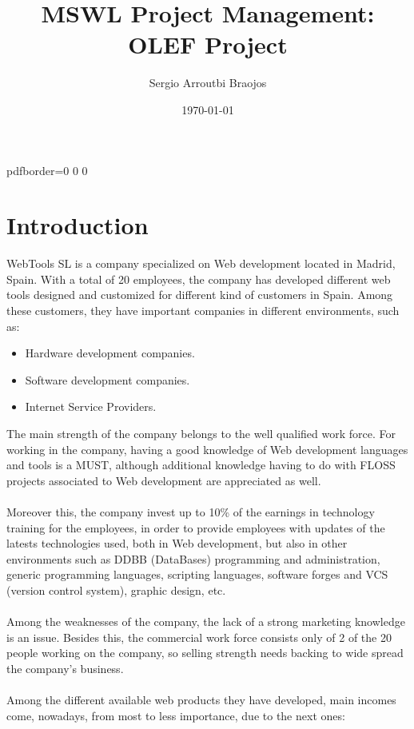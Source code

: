 \documentclass[11pt]{article}
\title{\textbf{MSWL Project Management: OLEF Project}}
\author{Sergio Arroutbi Braojos}
\date{\today}
\begin{document}
\hypersetup
{   
pdfborder={0 0 0}
}
   
\maketitle

\tableofcontents

\pagebreak

\section{Introduction}
WebTools SL is a company specialized on Web development located in Madrid, Spain. With a total of 20 employees, the company has developed different web tools designed and customized for different kind of customers in Spain. Among these customers, they have important companies in different environments, such as:
\begin{itemize}\itemsep0pt
\item{Hardware development companies.}
\item{Software development companies.}
\item{Internet Service Providers.}
\end{itemize}
The main strength of the company belongs to the well qualified work force. For working in the company, having a good knowledge of Web development languages and tools is a MUST, although additional knowledge having to do with FLOSS projects associated to Web development are appreciated as well.\\
\\
Moreover this, the company invest up to 10\% of the earnings in technology training for the employees, in order to provide employees with updates of the latests technologies used, both in Web development, but also in other environments such as DDBB (DataBases) programming and administration, generic programming languages, scripting languages, software forges and VCS (version control system), graphic design, etc.\\
\\
Among the weaknesses of the company, the lack of a strong marketing knowledge is an issue. Besides this, the commercial work force consists only of 2 of the 20 people working on the company, so selling strength needs backing to wide spread the company's business.\\
\\
Among the different available web products they have developed, main incomes come, nowadays, from most to less importance, due to the next ones:
\end{document}
